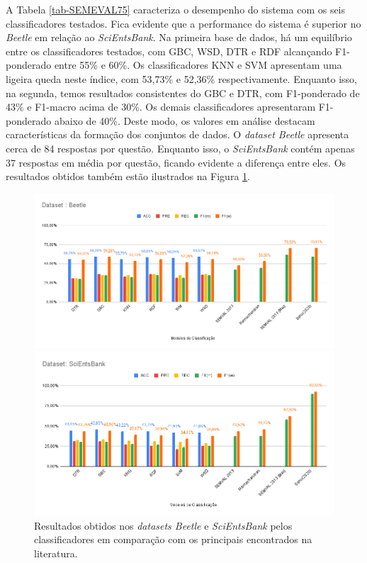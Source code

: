 A Tabela \ref{tab-SEMEVAL75} caracteriza o desempenho do sistema com os seis classificadores testados. Fica evidente que a performance do sistema é superior no \textit{Beetle} em relação ao \textit{SciEntsBank}. Na primeira base de dados, há um equilíbrio entre os classificadores testados, com GBC, WSD, DTR e RDF alcançando F1-ponderado entre 55\% e 60\%. Os classificadores KNN e SVM apresentam uma ligeira queda neste índice, com 53,73\% e 52,36\% respectivamente. Enquanto isso, na segunda, temos resultados consistentes do GBC e DTR, com F1-ponderado de 43\% e F1-macro acima de 30\%. Os demais classificadores apresentaram F1-ponderado abaixo de 40\%. Deste modo, os valores em análise destacam características da formação dos conjuntos de dados. O \textit{dataset Beetle} apresenta cerca de 84 respostas por questão. Enquanto isso, o \textit{SciEntsBank} contém apenas 37 respostas em média por questão, ficando evidente a diferença entre eles. Os resultados obtidos também estão ilustrados na Figura \ref{fig-semeval75}.

\begin{figure}[!h]
\centering
\includegraphics[width=\textwidth]{figuras/Beetle-75.png}

\includegraphics[width=\textwidth]{figuras/SciEntsBank-75.png}
\caption{Resultados obtidos nos \textit{datasets Beetle} e \textit{SciEntsBank} pelos classificadores em comparação com os principais encontrados na literatura.}
\label{fig-semeval75}
\end{figure}

